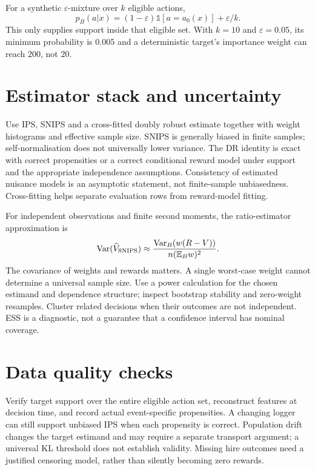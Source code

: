 \documentclass[11pt,oneside]{scrbook}
\begin{document}
For a synthetic $\varepsilon$-mixture over $k$ eligible actions,
\[
 p_B(a|x)=(1-\varepsilon)\mathbb{1}[a=a_0(x)]+\varepsilon/k.
\]
This only supplies support inside that eligible set. With $k=10$ and
$\varepsilon=0.05$, its minimum probability is $0.005$ and a deterministic
target's importance weight can reach $200$, not $20$.

\section{Estimator stack and uncertainty}
Use IPS, SNIPS and a cross-fitted doubly robust estimate together with
weight histograms and effective sample size. SNIPS is generally biased in
finite samples; self-normalisation does not universally lower variance.
The DR identity is exact with correct propensities or a correct conditional
reward model under support and the appropriate independence assumptions.
Consistency of estimated nuisance models is an asymptotic statement, not
finite-sample unbiasedness. Cross-fitting helps separate evaluation rows
from reward-model fitting.

For independent observations and finite second moments, the ratio-estimator
approximation is
\[
 \operatorname{Var}(\widehat V_{\mathrm{SNIPS}})
 \approx\frac{\operatorname{Var}_B(w(R-V))}{n(\mathbb{E}_Bw)^2}.
\]
The covariance of weights and rewards matters. A single worst-case weight
cannot determine a universal sample size. Use a power calculation for the
chosen estimand and dependence structure; inspect bootstrap stability and
zero-weight resamples. Cluster related decisions when their outcomes are
not independent. ESS is a diagnostic, not a guarantee that a confidence
interval has nominal coverage.

\section{Data quality checks}
Verify target support over the entire eligible action set, reconstruct
features at decision time, and record actual event-specific propensities.
A changing logger can still support unbiased IPS when each propensity is
correct. Population drift changes the target estimand and may require a
separate transport argument; a universal KL threshold does not establish
validity. Missing hire outcomes need a justified censoring model, rather
than silently becoming zero rewards.

\end{document}
